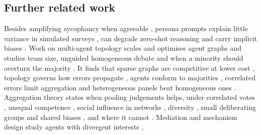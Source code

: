 \subsection{Further related work}
\label{app-related}
Besides amplifying sycophancy when agreeable \citep{shah2026toonice},
persona prompts explain little variance in simulated surveys
\citep{hu2024persona}, can degrade zero-shot reasoning \citep{kim2025persona}
and carry implicit biases \citep{gupta2024bias,deshpande2023toxicity}.
Work on multi-agent topology scales and optimises agent graphs
\citep{qian2025macnet,zhuge2024gptswarm,liu2024dylan} and studies team size,
unguided homogeneous debate and when a minority should overturn the majority
\citep{bertalanic2026ringelmann,bertalanic2026costconsensus,he2026minoritysentinel}.
It finds that sparse graphs are competitive at lower cost \citep{li2024sparse},
topology governs how errors propagate
\citep{shen2025propagation,han2026conformity}, agents conform to majorities
\citep{zhang2024socialpsych,weng2025conformity}, correlated errors limit
aggregation \citep{kim2025correlated} and heterogeneous panels beat
homogeneous ones \citep{wang2025moa}.
Aggregation theory states when pooling judgements helps, under correlated
votes \citep{ladha1992condorcet,boland1989majority}, unequal competence
\citep{shapley1984optimizing,nitzan1982optimal,bahrami2010optimally}, social
influence in networks
\citep{degroot1974reaching,golub2010naive,lorenz2011social,becker2017network},
diversity \citep{zollman2010epistemic,hong2004groups,thompson2014diversity},
small deliberating groups \citep{navajas2018aggregated} and shared biases
\citep{prelec2017solution}, and where it cannot \citep{list2002aggregating}.
Mediation and mechanism design study agents with divergent interests
\citep{dafoe2020cooperative,akata2025repeated,piatti2024cooperate,leon2026personas,tewolde2026coopeval},
